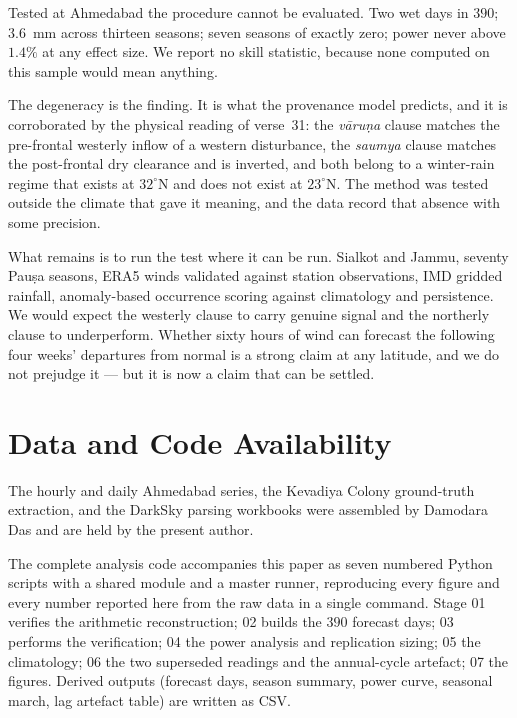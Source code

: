 \documentclass[11pt,a4paper]{article}
\newcommand{\skt}[1]{\textcolor{skt}{\textit{#1}}}
\begin{document}
Tested at Ahmedabad the procedure cannot be evaluated. Two wet days in $390$; $3.6$~mm across thirteen seasons; seven seasons of exactly zero; power never above $1.4\%$ at any effect size. We report no skill statistic, because none computed on this sample would mean anything.

The degeneracy is the finding. It is what the provenance model predicts, and it is corroborated by the physical reading of verse~31: the \skt{vāruṇa} clause matches the pre-frontal westerly inflow of a western disturbance, the \skt{saumya} clause matches the post-frontal dry clearance and is inverted, and both belong to a winter-rain regime that exists at $32^\circ$N and does not exist at $23^\circ$N. The method was tested outside the climate that gave it meaning, and the data record that absence with some precision.

What remains is to run the test where it can be run. Sialkot and Jammu, seventy Pauṣa seasons, ERA5 winds validated against station observations, IMD gridded rainfall, anomaly-based occurrence scoring against climatology and persistence. We would expect the westerly clause to carry genuine signal and the northerly clause to underperform. Whether sixty hours of wind can forecast the following four weeks' departures from normal is a strong claim at any latitude, and we do not prejudge it --- but it is now a claim that can be settled.

\section*{Data and Code Availability}
The hourly and daily Ahmedabad series, the Kevadiya Colony ground-truth extraction, and the DarkSky parsing workbooks were assembled by Damodara Das and are held by the present author.

The complete analysis code accompanies this paper as seven numbered Python scripts with a shared module and a master runner, reproducing every figure and every number reported here from the raw data in a single command. Stage 01 verifies the arithmetic reconstruction; 02 builds the $390$ forecast days; 03 performs the verification; 04 the power analysis and replication sizing; 05 the climatology; 06 the two superseded readings and the annual-cycle artefact; 07 the figures. Derived outputs (forecast days, season summary, power curve, seasonal march, lag artefact table) are written as CSV.
\end{document}
